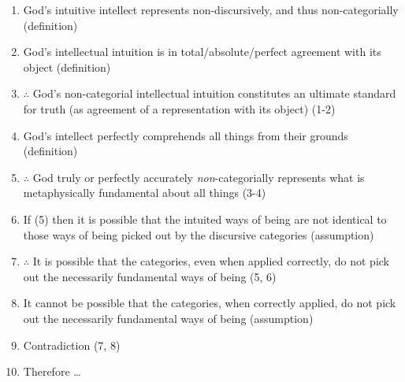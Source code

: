 \documentclass[12pt]{article}
\begin{document}
\begin{enumerate}
\item God's intuitive intellect represents non-discursively, and thus
non-categorially (definition)
\item God's intellectual intuition is in total/absolute/perfect agreement
with its object (definition)
\item \(\therefore\) God's non-categorial intellectual intuition constitutes an ultimate
standard for truth (as agreement of a representation with its object) (1-2)
\item God's intellect perfectly comprehends all things from their grounds
(definition)
\item \(\therefore\) God truly or perfectly accurately \emph{non}-categorially represents what is
metaphysically fundamental about all things (3-4)
\item If (5) then it is possible that the intuited ways of being are not
identical to those ways of being picked out by the discursive
categories (assumption)
\item \(\therefore\) It is possible that the categories, even when applied correctly, do not
pick out the necessarily fundamental ways of being (5, 6)
\item It cannot be possible that the categories, when correctly applied, do not
pick out the necessarily fundamental ways of being (assumption)
\item Contradiction (7, 8)
\item Therefore \ldots{}
\end{enumerate}
\end{document}
